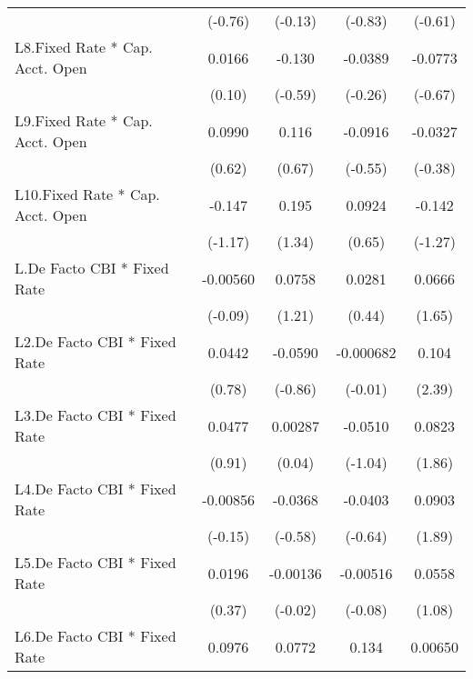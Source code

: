{\begin{longtable}{l*{4}{c}}
                &  (-0.76)         &  (-0.13)         &  (-0.83)         &  (-0.61)         \\
[1em]
L8.Fixed Rate * Cap. Acct. Open&   0.0166         &   -0.130         &  -0.0389         &  -0.0773         \\
                &   (0.10)         &  (-0.59)         &  (-0.26)         &  (-0.67)         \\
[1em]
L9.Fixed Rate * Cap. Acct. Open&   0.0990         &    0.116         &  -0.0916         &  -0.0327         \\
                &   (0.62)         &   (0.67)         &  (-0.55)         &  (-0.38)         \\
[1em]
L10.Fixed Rate * Cap. Acct. Open&   -0.147         &    0.195         &   0.0924         &   -0.142         \\
                &  (-1.17)         &   (1.34)         &   (0.65)         &  (-1.27)         \\
[1em]
L.De Facto CBI * Fixed Rate& -0.00560         &   0.0758         &   0.0281         &   0.0666         \\
                &  (-0.09)         &   (1.21)         &   (0.44)         &   (1.65)         \\
[1em]
L2.De Facto CBI * Fixed Rate&   0.0442         &  -0.0590         &-0.000682         &    0.104\sym{*}  \\
                &   (0.78)         &  (-0.86)         &  (-0.01)         &   (2.39)         \\
[1em]
L3.De Facto CBI * Fixed Rate&   0.0477         &  0.00287         &  -0.0510         &   0.0823         \\
                &   (0.91)         &   (0.04)         &  (-1.04)         &   (1.86)         \\
[1em]
L4.De Facto CBI * Fixed Rate& -0.00856         &  -0.0368         &  -0.0403         &   0.0903         \\
                &  (-0.15)         &  (-0.58)         &  (-0.64)         &   (1.89)         \\
[1em]
L5.De Facto CBI * Fixed Rate&   0.0196         & -0.00136         & -0.00516         &   0.0558         \\
                &   (0.37)         &  (-0.02)         &  (-0.08)         &   (1.08)         \\
[1em]
L6.De Facto CBI * Fixed Rate&   0.0976\sym{*}  &   0.0772         &    0.134\sym{*}  &  0.00650         \\

\end{longtable}}
